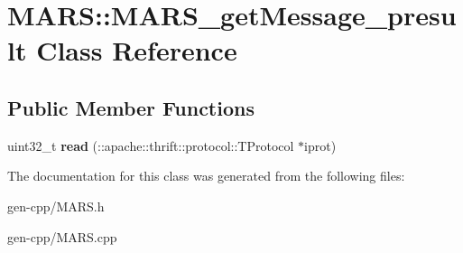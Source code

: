 \hypertarget{classMARS_1_1MARS__getMessage__presult}{}\section{M\+A\+RS\+:\+:M\+A\+R\+S\+\_\+get\+Message\+\_\+presult Class Reference}
\label{classMARS_1_1MARS__getMessage__presult}
\subsection*{Public Member Functions}
\begin{DoxyCompactItemize}
\item 
\mbox{\label{classMARS_1_1MARS__getMessage__presult_a34506aa87e09ead26114b2c7b9c8271f}} 
uint32\+\_\+t {\bfseries read} (\+::apache\+::thrift\+::protocol\+::\+T\+Protocol $\ast$iprot)
\end{DoxyCompactItemize}


The documentation for this class was generated from the following files\+:\begin{DoxyCompactItemize}
\item 
gen-\/cpp/M\+A\+R\+S.\+h\item 
gen-\/cpp/M\+A\+R\+S.\+cpp\end{DoxyCompactItemize}

